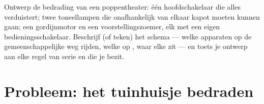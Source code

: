\begin{exercise}[$\star\star\star$]\label{exo:g6:circuits-and-safety:12}
Ontwerp de bedrading van een poppentheater: één hoofdschakelaar die
alles verduistert; twee toneellampen die onafhankelijk van elkaar
kapot moeten kunnen gaan; een gordijnmotor en een
voorstellingszoemer, elk met een eigen bedieningsschakelaar.
Beschrijf (of teken) het schema --- welke apparaten op de
gemeenschappelijke weg rijden, welke op , waar elke
 zit --- en toets je ontwerp aan elke regel van serie en
 die je bezit.
\end{exercise}

\section{Probleem: het tuinhuisje bedraden}

